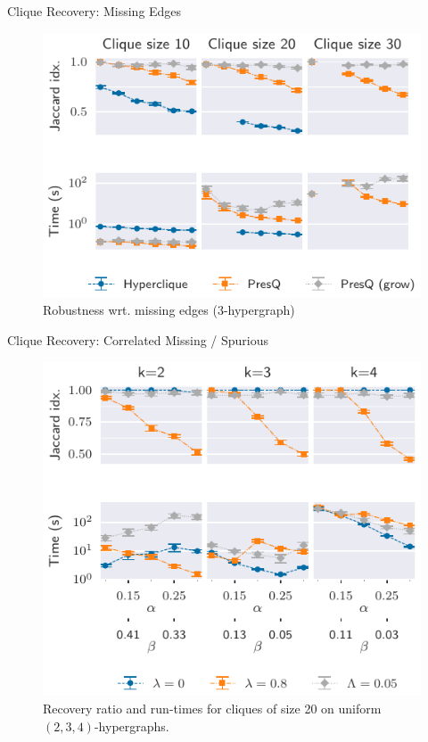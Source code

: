\documentclass[10pt]{beamer}
\begin{document}
\begin{frame}{Clique Recovery: Missing Edges}
    \begin{figure}
        \centering
        \includegraphics{3hyper_alpha}
        \caption{Robustness wrt. missing edges (3-hypergraph)}
    \end{figure}
\end{frame}

\begin{frame}{Clique Recovery: Correlated Missing / Spurious}
\begin{figure}
    \centering
    \includegraphics{quasi_corr_20}
    \caption{
    Recovery ratio and run-times for cliques of size 20 on uniform $(2,3,4)$-hypergraphs.
    }
\end{figure}

\end{frame}
\end{document}
